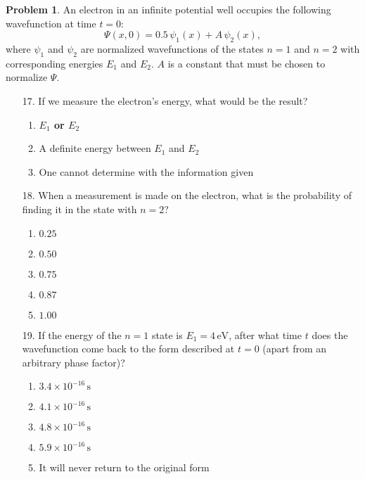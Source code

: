 \documentclass[12pt]{article}
\theoremstyle{definition} %
\newtheorem{problem}{Problem}
\theoremstyle{plain} %
\begin{document}
\begin{problem}
    
An electron in an infinite potential well occupies the following wavefunction at time \(t = 0\):
$$
\Psi(x,0) = 0.5 \, \psi_1(x) + A \, \psi_2(x),
$$
where \(\psi_1\) and \(\psi_2\) are normalized wavefunctions of the states \(n = 1\) and \(n = 2\) with corresponding energies \(E_1\) and \(E_2\). \(A\) is a constant that must be chosen to normalize \(\Psi\).

\begin{enumerate}
    \item[17.] If we measure the electron’s energy, what would be the result?
    \begin{enumerate}
        \item \textbf{\(E_1\) or \(E_2\)}
        \item A definite energy between \(E_1\) and \(E_2\)
        \item One cannot determine with the information given
    \end{enumerate}

    \item[18.] When a measurement is made on the electron, what is the probability of finding it in the state with \(n = 2\)?
    \begin{enumerate}
        \item \(0.25\)
        \item \(0.50\)
        \item \textbf{\(0.75\)}
        \item \(0.87\)
        \item \(1.00\)
    \end{enumerate}

    \item[19.] If the energy of the \(n = 1\) state is \(E_1 = 4 \, \text{eV}\), after what time \(t\) does the wavefunction come back to the form described at \(t = 0\) (apart from an arbitrary phase factor)?
    \begin{enumerate}
        \item \textbf{\(3.4 \times 10^{-16} \, \text{s}\)}
        \item \(4.1 \times 10^{-16} \, \text{s}\)
        \item \(4.8 \times 10^{-16} \, \text{s}\)
        \item \(5.9 \times 10^{-16} \, \text{s}\)
        \item It will never return to the original form
    \end{enumerate}
\end{enumerate}


\end{problem}
\end{document}
